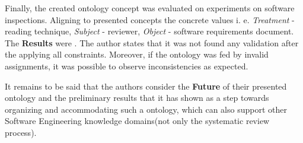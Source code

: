 	Finally, the created ontology concept was evaluated on experiments on software inspections\cite{Bas99}. Aligning to presented concepts the concrete values i. e. \textit{Treatment} - reading technique, \textit{Subject} - reviewer, \textit{Object} - software requirements document. The \textbf{Results} were \frqq\cite[p. 15]{SiyWu12}. The author states that it was not found any validation after the applying all constraints. Moreover, if the ontology was fed by  invalid assignments, it was possible to observe inconsistencies as expected.
	
	It remains to be said that the authors consider the \textbf{Future} of their presented ontology and the preliminary results that it has shown as a step towards organizing and accommodating such a ontology, which can also support other Software Engineering knowledge domains(not only the systematic review process).  \newline
	
